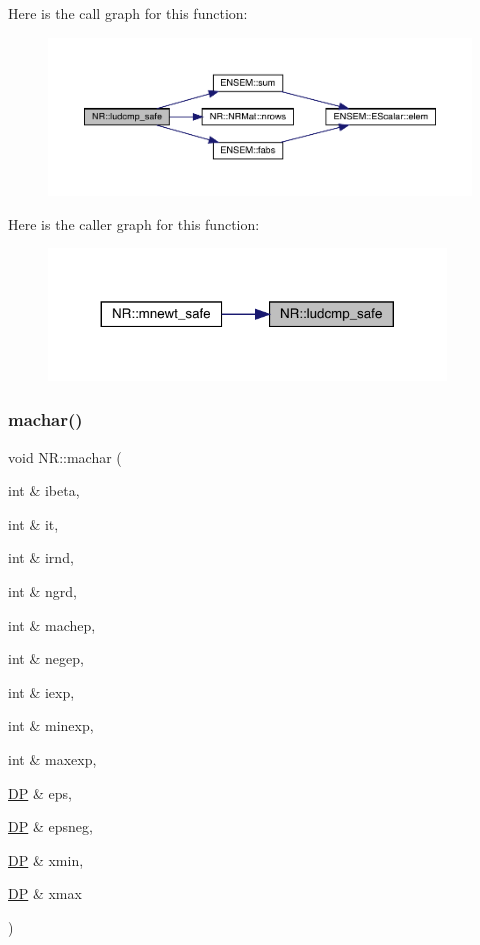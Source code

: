 Here is the call graph for this function\+:
\nopagebreak
\begin{figure}[H]
\begin{center}
\leavevmode
\includegraphics[width=350pt]{da/d46/namespaceNR_a03fd0ba9f0721c1fe3355bd81704727d_cgraph}
\end{center}
\end{figure}
Here is the caller graph for this function\+:
\nopagebreak
\begin{figure}[H]
\begin{center}
\leavevmode
\includegraphics[width=299pt]{da/d46/namespaceNR_a03fd0ba9f0721c1fe3355bd81704727d_icgraph}
\end{center}
\end{figure}
\mbox{\label{namespaceNR_ac38efbaed34a2e071711a215801215fd}} 
\subsubsection{\texorpdfstring{machar()}{machar()}}
{\footnotesize\ttfamily void N\+R\+::machar (\begin{DoxyParamCaption}\item[{int \&}]{ibeta,  }\item[{int \&}]{it,  }\item[{int \&}]{irnd,  }\item[{int \&}]{ngrd,  }\item[{int \&}]{machep,  }\item[{int \&}]{negep,  }\item[{int \&}]{iexp,  }\item[{int \&}]{minexp,  }\item[{int \&}]{maxexp,  }\item[{\mbox{\hyperlink{namespaceNR_af6ff762dd605ff477b8e52387253a02a}{DP}} \&}]{eps,  }\item[{\mbox{\hyperlink{namespaceNR_af6ff762dd605ff477b8e52387253a02a}{DP}} \&}]{epsneg,  }\item[{\mbox{\hyperlink{namespaceNR_af6ff762dd605ff477b8e52387253a02a}{DP}} \&}]{xmin,  }\item[{\mbox{\hyperlink{namespaceNR_af6ff762dd605ff477b8e52387253a02a}{DP}} \&}]{xmax }\end{DoxyParamCaption})}

